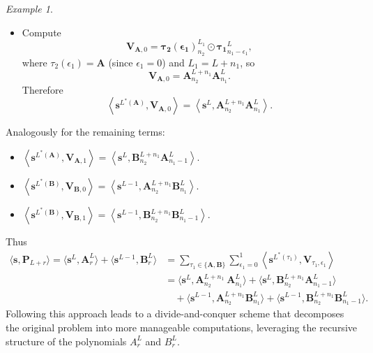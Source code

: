 \documentclass[11pt]{article}
\theoremstyle{definition}
\theoremstyle{remark}
\newtheorem{ex}[thm]{Example}
\numberwithin{equation}{section}
\begin{document}
\begin{ex}
\begin{itemize}
    \item Compute
    $$\mathbf{V}_{\mathbf{A}, 0} = \mathbf{\tau_2(\epsilon_1)}_{n_2}^{L_{1}} \odot \mathbf{\tau_1}_{n_1 - \epsilon_1}^{L},$$
    where \(\tau_2(\epsilon_1) = \mathbf{A}\) (since \(\epsilon_1 = 0\)) and \(L_1 = L + n_1\), so
    \[
    \mathbf{V}_{\mathbf{A},0} = \mathbf{A}_{n_2}^{L + n_1}  \mathbf{A}_{n_1}^{L}.
    \]
    Therefore
    \[
    \left\langle \mathbf{s}^{L^*(\mathbf{A})}, \mathbf{V}_{\mathbf{A}, 0} \right\rangle = \left\langle \mathbf{s}^L, \mathbf{A}_{n_2}^{L + n_1} \mathbf{A}_{n_1}^{L} \right\rangle.
    \]
\end{itemize}
Analogously for the remaining terms:
\begin{itemize}
    \item $\left\langle \mathbf{s}^{L^*(\mathbf{A})}, \mathbf{V}_{\mathbf{A}, 1} \right\rangle = \left\langle \mathbf{s}^L, \mathbf{B}_{n_2}^{L + n_1} \mathbf{A}_{n_1-1}^{L} \right\rangle$.
    \item $\left\langle \mathbf{s}^{L^*(\mathbf{B})}, \mathbf{V}_{\mathbf{B}, 0} \right\rangle = \left\langle \mathbf{s}^{L-1}, \mathbf{A}_{n_2}^{L + n_1}  \mathbf{B}_{n_1}^{L} \right\rangle$.
    \item $\left\langle \mathbf{s}^{L^*(\mathbf{B})}, \mathbf{V}_{\mathbf{B}, 1} \right\rangle = \left\langle \mathbf{s}^{L-1}, \mathbf{B}_{n_2}^{L + n_1}  \mathbf{B}_{n_1-1}^{L} \right\rangle$.
\end{itemize}
Thus
\begin{align*}
   \langle \mathbf{s}, \mathbf{P}_{L+r} \rangle= \langle \mathbf{s}^L, \mathbf{A}_r^L \rangle + \langle \mathbf{s}^{L-1}, \mathbf{B}_r^L \rangle &= \sum_{\tau_1 \in \{\mathbf{A},\mathbf{B}\}} \sum_{\epsilon_1=0}^{1} \left\langle \mathbf{s}^{L^*(\tau_1)}, \mathbf{V}_{\tau_1, \epsilon_1} \right\rangle\\
    &=\langle \mathbf{s}^L, \mathbf{A}_{n_2}^{L + n_1} \ \mathbf{A}_{n_1}^{L} \rangle + \langle \mathbf{s}^L, \mathbf{B}_{n_2}^{L + n_1}  \mathbf{A}_{n_1-1}^{L} \rangle \\
    &\quad + \langle \mathbf{s}^{L-1}, \mathbf{A}_{n_2}^{L + n_1}  \mathbf{B}_{n_1}^{L} \rangle + \langle \mathbf{s}^{L-1}, \mathbf{B}_{n_2}^{L + n_1} \mathbf{B}_{n_1-1}^{L} \rangle.
\end{align*}
Following this approach leads to a divide-and-conquer scheme that decomposes the original problem into more manageable computations, leveraging the recursive structure of the polynomials $A_r^L$ and $B_r^L$.\\%


\end{ex}
\end{document}
